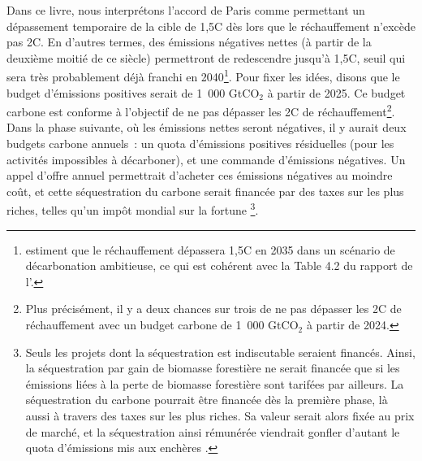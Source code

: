 \documentclass[a5paper,french,openany]{memoir}
\begin{document}
Dans ce livre, nous interprétons l'accord de Paris comme permettant un dépassement temporaire de la cible de 1,5\textdegree{}C dès lors que le réchauffement n'excède pas 2\textdegree{}C. En d'autres termes, des émissions négatives nettes (à partir de la deuxième moitié de ce siècle) permettront de redescendre jusqu'à 1,5\textdegree{}C, seuil qui sera très probablement déjà franchi en 2040\footnote{\citet{diffenbaugh_data-driven_2023} estiment que le réchauffement dépassera 1,5\textdegree{}C en 2035 dans un scénario de décarbonation ambitieuse, ce qui est cohérent avec la Table 4.2 du rapport de l'\citet{ipcc_climate_2021}.}. 
Pour fixer les idées, disons que le budget d'émissions positives serait de 1~000 GtCO$_\text{2}$ à partir de 2025. Ce budget carbone est conforme à l'objectif de ne pas dépasser les 2\textdegree{}C de réchauffement\footnote{Plus précisément, il y a deux chances sur trois de ne pas dépasser les 2\textdegree{}C de réchauffement avec un budget carbone de 1~000 GtCO$_\text{2}$ à partir de 2024.}. 
Dans la phase suivante, où les émissions nettes seront négatives, il y aurait deux budgets carbone annuels~: un quota d'émissions positives résiduelles (pour les activités impossibles à décarboner), et une commande d'émissions négatives. Un appel d'offre annuel permettrait d'acheter ces émissions négatives au moindre coût, et cette séquestration du carbone serait financée par des taxes sur les plus riches, telles qu'un impôt mondial sur la fortune
\footnote{Seuls les projets dont la séquestration est indiscutable seraient financés. Ainsi, la séquestration par gain de biomasse forestière ne serait financée que si les émissions liées à la perte de biomasse forestière sont tarifées par ailleurs. La séquestration du carbone pourrait être financée dès la première phase, là aussi à travers des taxes sur les plus riches. Sa valeur serait alors fixée au prix de marché, et la séquestration ainsi rémunérée viendrait gonfler d'autant le quota d'émissions mis aux enchères \citep{edenhofer_governance_2023}.}. %
\end{document}
